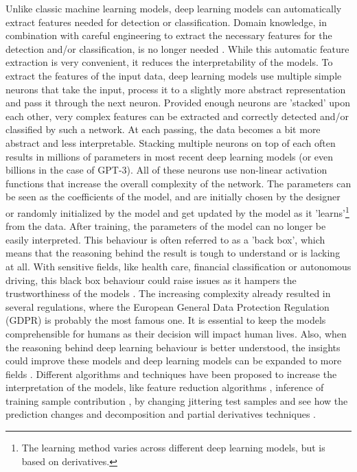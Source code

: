 \documentclass{article}
\begin{document}
Unlike classic machine learning models, deep learning models can automatically extract features needed for detection or classification.
Domain knowledge, in combination with careful engineering to extract the necessary features for the detection and/or classification, is no longer needed \cite{lecun_deep_2015}.
While this automatic feature extraction is very convenient, it reduces the interpretability of the models.
To extract the features of the input data, deep learning models use multiple simple neurons that take the input, process it to a slightly more abstract representation and pass it through the next neuron.
Provided enough neurons are 'stacked' upon each other, very complex features can be extracted and correctly detected and/or classified by such a network.
At each passing, the data becomes a bit more abstract and less interpretable.
Stacking multiple neurons on top of each often results in millions of parameters in most recent deep learning models (or even billions in the case of GPT-3).
All of these neurons use non-linear activation functions that increase the overall complexity of the network.
The parameters can be seen as the coefficients of the model, and are initially chosen by the designer or randomly initialized by the model and get updated by the model as it 'learns'\footnote{The learning method varies across different deep learning models, but is based on derivatives.} from the data.
After training, the parameters of the model can no longer be  easily interpreted.
This behaviour is often referred to as a 'back box', which means that the reasoning behind the result is tough to understand or is lacking at all.
With sensitive fields, like health care, financial classification or autonomous driving, this black box behaviour could raise issues as it hampers the trustworthiness of the models \cite{carvalho_machine_2019}.
The increasing complexity already resulted in several regulations, where the European General Data Protection Regulation (GDPR) is probably the most famous one.
It is essential to keep the models comprehensible for humans as their decision will impact human lives.
Also, when the reasoning behind deep learning behaviour is better understood, the insights could improve these models \cite{amershi_modeltracker_2015} and deep learning models can be expanded to more fields \cite{lei_opening_2018}.
Different algorithms and techniques have been proposed to increase the interpretation of the models, like feature reduction algorithms \cite{ribeiro_why_2016}, inference of training sample contribution \cite{koh_understanding_2020}, by changing jittering test samples and see how the prediction changes \cite{li_understanding_2017} and decomposition and partial derivatives techniques \cite{samek_explainable_2017}.
\end{document}
